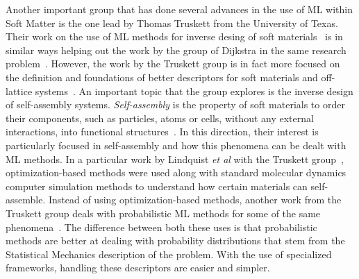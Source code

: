 Another important group that has done several advances in the use of ML within Soft Matter
is the one lead by Thomas Truskett from the University of Texas.
Their work on the use of ML methods for inverse desing of soft materials~\cite{shermanInverseMethodsDesign2020a}
is in similar ways helping out the work by the group of Dijkstra in the same research
problem~\cite{APSAPSMarcha}.
However, the work by the Truskett group is in fact more focused on the definition and
foundations of better descriptors for soft materials and off-lattice systems~\cite{jadrichUnsupervisedMachineLearning2018}.
An important topic that the group explores is the inverse design of self-assembly
systems. \emph{Self-assembly} is the property of soft materials to order their
components, such as particles, atoms or cells, without any external interactions,
into functional structures~\cite{grzybowskiSelfassemblyCrystalsCells2009}.
In this direction, their interest is particularly focused in self-assembly and how this 
phenomena can be dealt with ML methods.
In a particular work by Lindquist \emph{et al} with the Truskett group~\cite{lindquistCommunicationInverseDesign2016},
optimization-based methods were used along with standard molecular dynamics computer
simulation methods to understand how certain materials can self-assemble.
Instead of using optimization-based methods, another work from the Truskett group
deals with probabilistic ML methods for some of the same phenomena~\cite{jadrichProbabilisticInverseDesign2017}.
The difference between both these uses is that probabilistic methods are better at dealing
with probability distributions that stem from the Statistical Mechanics description of the
problem. With the use of specialized frameworks, handling these descriptors are easier
and simpler.


